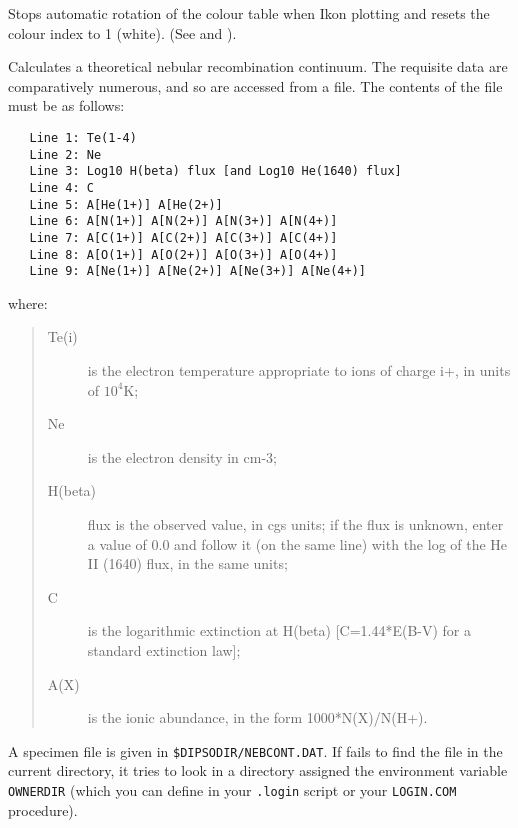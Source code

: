 \begin {description}
Stops automatic rotation of the colour table when Ikon plotting and
resets the colour index to 1 (white). (See   and ). 

Calculates a theoretical nebular recombination continuum. The
requisite data are comparatively numerous, and so are accessed from a
file. The contents of the file must be as follows:

\begin{verbatim}
   Line 1: Te(1-4)
   Line 2: Ne
   Line 3: Log10 H(beta) flux [and Log10 He(1640) flux]
   Line 4: C
   Line 5: A[He(1+)] A[He(2+)]
   Line 6: A[N(1+)] A[N(2+)] A[N(3+)] A[N(4+)]
   Line 7: A[C(1+)] A[C(2+)] A[C(3+)] A[C(4+)]
   Line 8: A[O(1+)] A[O(2+)] A[O(3+)] A[O(4+)]
   Line 9: A[Ne(1+)] A[Ne(2+)] A[Ne(3+)] A[Ne(4+)]
\end{verbatim}

where:

\begin{quote}
\begin{description}

\item [Te(i)] is the electron temperature appropriate to ions of
charge i+, in units of $10^{4}$K;

\item [Ne] is the electron density in cm-3;

\item [H(beta)] flux is the observed value, in cgs units; if the flux
is unknown, enter a value of 0.0 and follow it (on the same line) with
the log of the He II (1640) flux, in the same units;

\item [C] is the logarithmic extinction at H(beta) [C=1.44*E(B-V) for
a standard extinction law];

\item [A(X)] is the ionic abundance, in the form 1000*N(X)/N(H+).

\end{description}
\end{quote}

A specimen file is given in {\tt{\$DIPSODIR/NEBCONT.DAT}}. 
If   fails to find the
file in the current directory, it tries to look in a directory
assigned the environment variable {\tt{OWNERDIR}}  (which
you can define in your {\tt{.login}}  script or your {\tt{LOGIN.COM}}  procedure).


\end{description}
